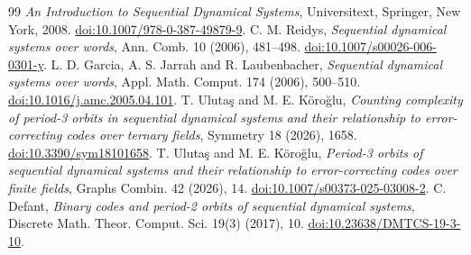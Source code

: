 \documentclass[11pt]{article}
\begin{document}
\begin{thebibliography}{99}
\emph{An Introduction to Sequential Dynamical Systems},
Universitext, Springer, New York, 2008.
\href{https://doi.org/10.1007/978-0-387-49879-9}{doi:10.1007/978-0-387-49879-9}.
 C. M. Reidys,
\emph{Sequential dynamical systems over words},
Ann. Comb. 10 (2006), 481--498.
\href{https://doi.org/10.1007/s00026-006-0301-y}{doi:10.1007/s00026-006-0301-y}.
 L. D. Garcia, A. S. Jarrah and R. Laubenbacher,
\emph{Sequential dynamical systems over words},
Appl. Math. Comput. 174 (2006), 500--510.
\href{https://doi.org/10.1016/j.amc.2005.04.101}{doi:10.1016/j.amc.2005.04.101}.
 T. Uluta\c{s} and M. E. K\"oro\u{g}lu,
\emph{Counting complexity of period-3 orbits in sequential dynamical systems and their relationship to error-correcting codes over ternary fields},
Symmetry 18 (2026), 1658.
\href{https://doi.org/10.3390/sym18101658}{doi:10.3390/sym18101658}.
 T. Uluta\c{s} and M. E. K\"oro\u{g}lu,
\emph{Period-3 orbits of sequential dynamical systems and their relationship to error-correcting codes over finite fields},
Graphs Combin. 42 (2026), 14.
\href{https://doi.org/10.1007/s00373-025-03008-2}{doi:10.1007/s00373-025-03008-2}.
 C. Defant,
\emph{Binary codes and period-2 orbits of sequential dynamical systems},
Discrete Math. Theor. Comput. Sci. 19(3) (2017), 10.
\href{https://doi.org/10.23638/DMTCS-19-3-10}{doi:10.23638/DMTCS-19-3-10}.
\end{thebibliography}
\end{document}

